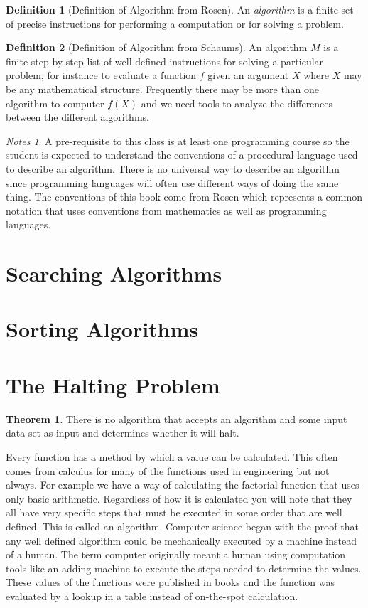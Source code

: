 \documentclass[11pt]{book} %
\theoremstyle {definition}
\newtheorem {definition}{Definition}[section]
\newtheorem {theorem}{Theorem}[section]
\theoremstyle {remark}
\newtheorem*{notes}{Notes}
\begin{document}
\begin{definition}[Definition of Algorithm from Rosen]
An \textit{algorithm} is a finite set of precise instructions for performing a computation or for solving a problem.
\end{definition}
\begin{definition}[Definition of Algorithm from Schaums]
An algorithm $M$ is a finite step-by-step list of well-defined instructions for solving a particular problem, for instance to evaluate a function $f$ given an argument $X$ where $X$ may be any mathematical structure. Frequently there may be more than one algorithm to computer $f(X)$ and we need tools to analyze the differences between the different algorithms.
\end{definition}

\begin{notes}
A pre-requisite to this class is at least one programming course so the student is expected to understand the conventions of a procedural language used to describe an algorithm. There is no universal way to describe an algorithm since programming languages will often use different ways of doing the same thing. The conventions of this book come from Rosen which represents a common notation that uses conventions from mathematics as well as programming languages.
\end{notes}

\section{Searching Algorithms}
\section{Sorting Algorithms}

\section{The Halting Problem}
\begin{theorem}
There is no algorithm that accepts an algorithm and some input data set as input and determines whether it will halt.
\end{theorem}

Every function has a method by which a value can be calculated. This often comes from calculus for many of the functions used in engineering but not always. For example we have a way of calculating the factorial function that uses only basic arithmetic. Regardless of how it is calculated you will note that they all have very specific steps that must be executed in some order that are well defined. This is called an algorithm. Computer science began with the proof that any well defined algorithm could be mechanically executed by a machine instead of a human. The term computer originally meant a human using computation tools like an adding machine to execute the steps needed to determine the values. These values of the functions were published in books and the function was evaluated by a lookup in a table instead of on-the-spot calculation.
\end{document}
